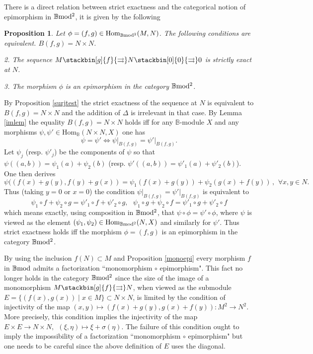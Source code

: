 \documentclass[12pt]{article}
\newtheorem{prop}[thm]{Proposition}
\def\Hom{{\rm Hom}}
\def\B{{\mathbb B}}
\def\strg{strict }
\def\strgly{strictly }
\def\qqq{\,,\,~\forall}
\def\Hom {{\mbox{Hom}}}
\def\bmod{{\rm \B mod}}
\def\bm2{{\rm \B mod^2}}
\begin{document}
 
 There is a direct relation between \strg exactness and the categorical  notion of epimorphism in $\bm2$, it is given by the following 
   \begin{prop}\label{epimorphism} Let $\phi=(f,g)\in \Hom_\bm2(M,N)$. The following conditions are equivalent. $B(f,g)=N\times N$.
   
  2. The sequence
    $M\stackbin[g]{f}{\rightrightarrows}N\stackbin[0]{0}{\rightrightarrows}0$
    is  \strgly exact at $N$.
    
    3.	The morphism $\phi$ is an epimorphism in the category $\bm2$.
     \end{prop}
    \proof By Proposition \ref{surjtest} the \strg exactness of the sequence at $N$ is equivalent to $B(f,g)=N\times N$ and the addition of $\Delta$ is irrelevant in that case. By Lemma \ref{imlem} the equality  $B(f,g)=N\times N$ holds iff for any $\B$-module $X$ and any morphisms $\psi,\psi'\in \Hom_\B(N\times N, X)$ one has 
    $$
    \psi=\psi'\iff \psi\vert_{B(f,g)}=\psi'\vert_{B(f,g)}.
    $$
   Let $\psi_j$ (resp. $\psi'_j$) be the components of $\psi$ so that $\psi((a,b))=\psi_1(a)+\psi_2(b)$ (resp. $\psi'((a,b))=\psi'_1(a)+\psi'_2(b)$). One then derives 
   $$
   \psi((f(x)+g(y),f(y)+g(x))=\psi_1(f(x)+g(y))+\psi_2(g(x)+f(y))\qqq x,y\in N.
   $$
   Thus (taking $y=0$ or $x=0$) the condition $\psi\vert_{B(f,g)}=\psi'\vert_{B(f,g)}$ is equivalent to 
   $$
   \psi_1\circ f+\psi_2\circ g =\psi'_1\circ f+\psi'_2\circ g,\ \ \ \psi_1\circ g+\psi_2\circ f =\psi'_1\circ g+\psi'_2\circ f
   $$
   which means exactly, using composition in $\bm2$, that $\psi\circ \phi=\psi'\circ \phi$, where $\psi$ is viewed as the element $(\psi_1,\psi_2)\in \Hom_\bm2(N,X)$ and similarly for $\psi'$. Thus \strg exactness holds iff the morphism $\phi=(f,g)$ is an epimorphism in the category $\bm2$.\endproof
   
   
   
 By using the inclusion $f(N)\subset M$ and Proposition \ref{monoepi} every morphism  $f$ in $\bmod$ admits a factorization ``monomorphism $\circ$ epimorphism".  This fact no longer holds in the category $\bm2$ since the size of the image of a monomorphism $M\stackbin[g]{f}{\rightrightarrows}N$, when viewed as the  submodule $E=\{(f(x),g(x))\mid x\in M\}\subset N\times N$, is limited by the condition of injectivity of the map $(x,y)\mapsto (f(x)+g(y),g(x)+f(y)):M^2\to N^2$. More precisely, this condition implies the injectivity of  the map
   $
   E\times E\to N\times N, \ \ (\xi,\eta)\mapsto \xi+\sigma(\eta)
   $. 
   The failure of this condition ought to imply the impossibility  of a factorization ``monomorphism $\circ$ epimorphism" but one needs to be careful since the above definition of $E$ uses the diagonal.
\end{document}
